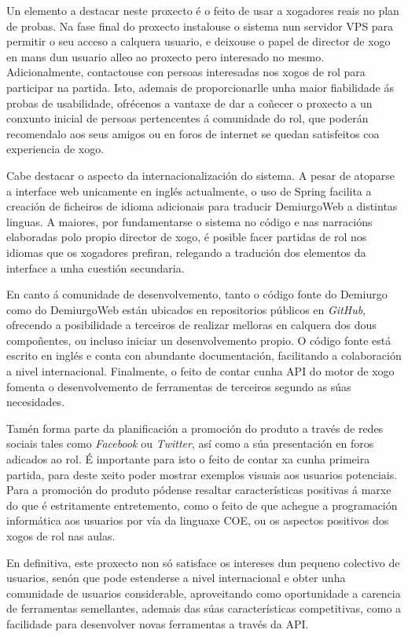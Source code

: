 Un elemento a destacar neste proxecto é o feito de usar a xogadores reais no
plan de probas. Na fase final do proxecto instalouse o sistema nun servidor VPS
para permitir o seu acceso a calquera usuario, e deixouse o papel de director de
xogo en mans dun usuario alleo ao proxecto pero interesado no mesmo.
Adicionalmente, contactouse con persoas interesadas nos xogos de rol para
participar na partida. Isto, ademais de proporcionarlle unha maior fiabilidade
ás probas de usabilidade, ofrécenos a vantaxe de dar a coñecer o proxecto a un
conxunto inicial de persoas pertencentes á comunidade do rol, que poderán
recomendalo aos seus amigos ou en foros de internet se quedan satisfeitos coa
experiencia de xogo.

Cabe destacar o aspecto da internacionalización do sistema. A pesar de atoparse
a interface web unicamente en inglés actualmente, o uso de Spring facilita
a creación de ficheiros de idioma adicionais para traducir DemiurgoWeb a
distintas linguas. A maiores, por fundamentarse o sistema no código e nas
narracións elaboradas polo propio director de xogo, é posible facer partidas de
rol nos idiomas que os xogadores prefiran, relegando a tradución dos elementos
da interface a unha cuestión secundaria.

En canto á comunidade de desenvolvemento, tanto o código fonte do Demiurgo como
do DemiurgoWeb están ubicados en repositorios públicos en \textit{GitHub},
ofrecendo a posibilidade a terceiros de realizar melloras en calquera dos dous
compoñentes, ou incluso iniciar un desenvolvemento propio. O código fonte está
escrito en inglés e conta con abundante documentación, facilitando a
colaboración a nivel internacional. Finalmente, o feito de contar cunha API do
motor de xogo fomenta o desenvolvemento de ferramentas de terceiros segundo as
súas necesidades.

Tamén forma parte da planificación a
promoción do produto a través de redes sociais tales como \textit{Facebook} ou
\textit{Twitter}, así como a súa presentación en foros adicados ao rol. É
importante para isto o feito de contar xa cunha primeira partida, para deste
xeito poder mostrar exemplos visuais aos usuarios potenciais. Para a
promoción do produto pódense resaltar características positivas á marxe do que é
estritamente entretemento, como o feito de que achegue a programación
informática aos usuarios por vía da linguaxe COE, ou os aspectos positivos dos
xogos de rol nas aulas.

En definitiva, este proxecto non só satisface os intereses dun pequeno colectivo
de usuarios, senón que pode estenderse a nivel internacional e obter unha
comunidade de usuarios considerable, aproveitando como oportunidade
a carencia de ferramentas semellantes, ademais das súas características
competitivas, como a facilidade para
desenvolver novas ferramentas a través da API.
